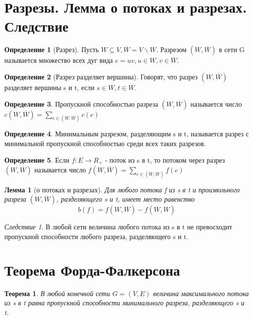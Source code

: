 \documentclass[a4paper]{article}
\newtheorem{theorem}{Теорема}[section]
\newtheorem{lemma}{Лемма}[section]
\theoremstyle{definition}
\newtheorem*{definition}{Определение}
\theoremstyle{remark}
\newtheorem*{corollary}{Следствие}
\begin{document}
\begin{multicols*}{2}
    \section{Разрезы. Лемма о потоках и разрезах. Следствие}
    \begin{definition}[Разрез]
        Пусть $W\subseteq V, \overline{W} = V \backslash  W$. Разрезом $(W, \overline{W})$ в сети G называется множество всех дуг вида $e = uv, u\in W, v\in \overline{W}$.
    \end{definition}
    \begin{definition}[Разрез разделяет вершины]
        Говорят, что разрез $(W, \overline{W})$ разделяет вершины s и t, если $s\in W, t\in \overline{W}$.
    \end{definition}
    \begin{definition}
        Пропускной способностью разреза $(W, \overline{W})$ называется число $c(W, \overline{W}) = \sum\limits_{e\in (W, \overline{W})} c(e)$
    \end{definition}
    \begin{definition}
        Минимальным разрезом, разделяющим s и t, называется разрез с минимальной пропускной способностью среди всех таких разрезов.
    \end{definition}
    \begin{definition}
        Если $f: E\to R_+$ - поток из s в t, то потоком через разрез $(W, \overline{W})$ называется число $f(W, \overline{W}) = \sum\limits_{e\in (W, \overline{W})} f(e)$
    \end{definition}
    \begin{lemma}[о потоках и разрезах]
        Для любого потока f из s в t и произвольного разреза $(W, \overline{W})$, разделяющего s и t, имеет место равенство
        $$b(f) = f(W, \overline{W}) - f(\overline{W}, W)$$
    \end{lemma}
    \begin{corollary}
        В любой сети величина любого потока из s в t не превосходит пропускной способности любого разреза, разделяющего s и t.
    \end{corollary}
    \section{Теорема Форда-Фалкерсона}
    \begin{theorem}
        В любой конечной сети $G = (V,E)$ величина максимального потока из s в t равна пропускной способности минимального разреза, разделяющего s и t.
    \end{theorem}

\end{multicols*}
\end{document}
